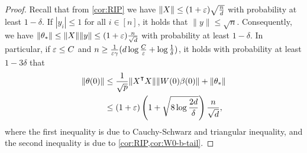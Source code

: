 \begin{proof}
    Recall that from \cref{cor:RIP} we have $\|X\|\leq (1+\varepsilon)\sqrt{\frac{n}{d}}$ with probability at least $1-\delta$. If $|y_i|\leq 1$ for all $i\in[n]$, it holds that $\|y\|\leq \sqrt{n}$. Consequently, we have $\|\theta_*\| \leq \|X\|\|y\| \leq (1+\varepsilon)\frac{n}{\sqrt{d}}$ with probability at least $1-\delta$. In particular, if $\varepsilon \leq C$ and $n \geq \frac{1}{\varepsilon\gamma} (d\log\frac{C}{\varepsilon} + \log\frac{1}{\delta})$, it holds with probability at least $1-3\delta$ that
    \begin{align*}
        \|\theta(0)\| & \leq \frac{1}{\sqrt{p}}\|X\transpose X\|\|W(0) \beta(0)\| + \|\theta_*\| \\
        & \leq (1+\eps)\left(1 + \sqrt{8\log\frac{2d}{\delta}}\right)\frac{n}{\sqrt{d}},
    \end{align*}
    where the first inequality is due to Cauchy-Schwarz and triangular inequality, and the second inequality is due to \cref{cor:RIP,cor:W0-b-tail}.
\end{proof}